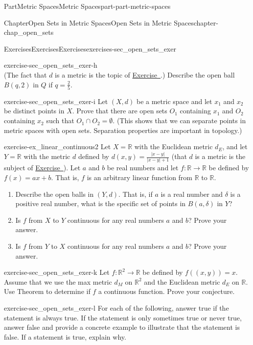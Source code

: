 \documentclass[oneside,10pt,]{book}
\newcommand{\xreffont}{\relax}
\numberwithin{equation}{chapter}
\newcommand{\R}{\mathbb{R}}
\begin{document}
\begin{partptx}{Part}{Metric Spaces}{}{Metric Spaces}{}{}{part-part-metric-spaces}
\begin{chapterptx}{Chapter}{Open Sets in Metric Spaces}{}{Open Sets in Metric Spaces}{}{}{chapter-chap_open_sets}
\begin{exercises-section}{Exercises}{Exercises}{}{Exercises}{}{}{exercises-sec_open_sets_exer}
\begin{divisionexercise}{8}{}{}{exercise-sec_open_sets_exer-h}
\begin{equation*}
\end{equation*}
(The fact that \(d\) is a metric is the topic of \hyperlink{exercise-ex_MS_Q_metric}{Exercise~{\xreffont 3}}.) Describe the open ball \(B(q,2)\) in \(Q\) if \(q = \frac{2}{5}\).%
\end{divisionexercise}%
\begin{divisionexercise}{9}{}{}{exercise-sec_open_sets_exer-i}%
Let \((X,d)\) be a metric space and let \(x_1\) and \(x_2\) be distinct points in \(X\). Prove that there are open sets \(O_1\) containing \(x_1\) and \(O_2\) containing \(x_2\) such that \(O_1 \cap O_2 = \emptyset\). (This shows that we can separate points in metric spaces with open sets. Separation properties are important in topology.)%
\end{divisionexercise}%
\begin{divisionexercise}{10}{}{}{exercise-ex_linear_continuous2}%
Let \(X = \R\) with the Euclidean metric \(d_E\), and let \(Y = \R\) with the metric \(d\) defined by \(d(x,y) = \frac{|x-y|}{|x-y|+1}\) (that \(d\) is a metric is the subject of \hyperlink{exercise-ex_1_over_1_plus_t_metric}{Exercise~{\xreffont 11}}). Let \(a\) and \(b\) be real numbers and let \(f:\R \to \R\) be defined by \(f(x) = ax+b\). That is, \(f\) is an arbitrary linear function from \(\R\) to \(\R\).%
\begin{enumerate}[font=\bfseries,label=(\alph*),ref=\alph*]%
\item{}Describe the open balls in \((Y, d)\). That is, if \(a\) is a real number and \(\delta\) is a positive real number, what is the specific set of points in \(B(a, \delta)\) in \(Y\)?%
\item{}Is \(f\) from \(X\) to \(Y\) continuous for any real numbers \(a\) and \(b\)? Prove your answer.%
\item{}Is \(f\) from \(Y\) to \(X\) continuous for any real numbers \(a\) and \(b\)? Prove your answer.%
\end{enumerate}%
\end{divisionexercise}%
\begin{divisionexercise}{11}{}{}{exercise-sec_open_sets_exer-k}%
Let \(f: \R^2 \to \R\) be defined by \(f((x,y)) = x\). Assume that we use the max metric \(d_M\) on \(\R^2\) and the Euclidean metric \(d_E\) on \(\R\). Use Theorem to determine if \(f\) a continuous function. Prove your conjecture.%
\end{divisionexercise}%
\begin{divisionexercise}{12}{}{}{exercise-sec_open_sets_exer-l}%
For each of the following, answer true if the statement is always true. If the statement is only sometimes true or never true, answer false and provide a concrete example to illustrate that the statement is false. If a statement is true, explain why.%

\end{divisionexercise}
\end{exercises-section}
\end{chapterptx}
\end{partptx}
\end{document}
